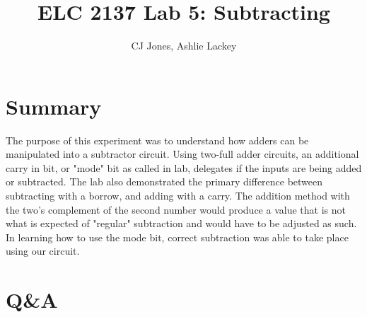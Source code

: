 \documentclass[11pt]{article}
\begin{document}
\title{ELC 2137 Lab 5: Subtracting}
\author{CJ Jones, Ashlie Lackey}

\maketitle


\section*{Summary}

The purpose of this experiment was to understand how adders can be manipulated into a subtractor circuit. Using two-full adder circuits, an additional carry in bit, or "mode" bit as called in lab, delegates if the inputs are being added or subtracted. The lab also demonstrated the primary difference between subtracting with a borrow, and adding with a carry. The addition method with the two's complement of the second number would produce a value that is not what is expected of "regular" subtraction and would have to be adjusted as such. In learning how to use the mode bit, correct subtraction was able to take place using our circuit.


\section*{Q\&A}
\end{document}
